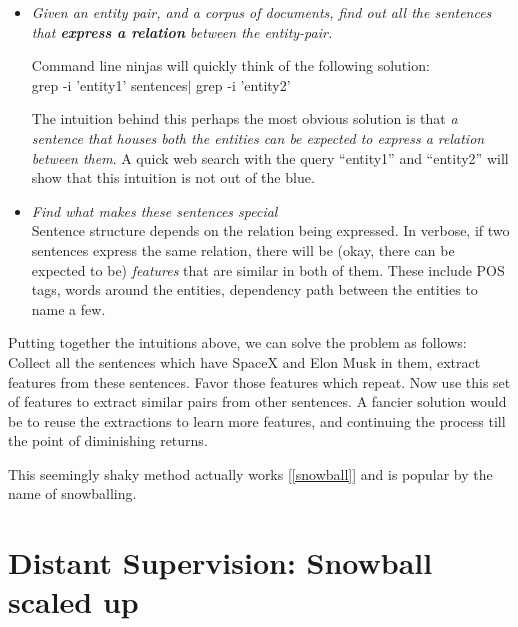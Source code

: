 \documentclass[a4paper,10pt]{article}
\begin{document}
\begin{itemize}
 
\item \emph{Given an entity pair, and a corpus of documents, find out all the sentences that
\textbf{express a relation} between the entity-pair.}

Command line ninjas will quickly think of the following solution:\\
grep -i 'entity1' sentences$\vert$ grep -i 'entity2'

The intuition behind this perhaps the most obvious solution is that \emph{a sentence
that houses both the entities can be expected to express a relation between them}.
A quick web search with the query ``entity1'' and ``entity2'' will show that this 
intuition is not out of the blue.

\item \emph{Find what makes these sentences special} \\
Sentence structure depends on the relation being expressed.
In verbose, if two sentences express the same relation, there will be (okay, there can be expected to be)
 \emph{features} that are similar in both of them. These include POS tags, words around the entities,
dependency path between the entities to name a few.

\end{itemize}
Putting together the intuitions above, we can solve the problem as follows:
Collect all the sentences which have SpaceX and Elon Musk in them, extract features 
from these sentences. Favor those features which repeat.
Now use this set of features to extract similar pairs from other sentences.
A fancier solution would be to reuse the extractions to learn more features, and continuing the process 
till the point of diminishing returns.

This seemingly shaky method actually works [\ref{snowball}] and is popular by the name of snowballing.

\section{Distant Supervision: Snowball scaled up}
\label{ds}
\end{document}

